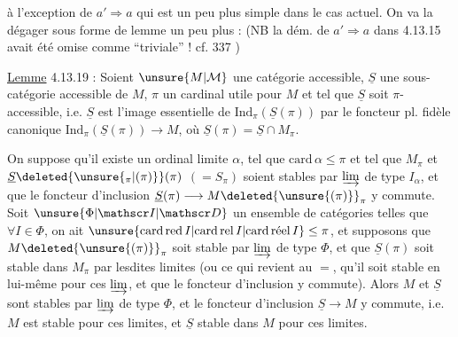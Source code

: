 
à l'exception de $a'\Rightarrow a$ qui est un peu plus simple dans le cas actuel. On va la dégager sous forme de lemme un peu plus  : (NB la dém. de $a'\Rightarrow a$ dans 4.13.15 avait été omise comme ``triviale'' ! cf.  337 \unsure{\ldots})

\uline{Lemme} 4.13.19 : Soient $\unsure{M|\mathcal M}$ une catégorie accessible, $\underline S$ une sous-catégorie accessible de $M$, $\pi$ un cardinal utile pour $M$ et tel que $\underline S$ soit $\pi$-accessible, i.e. $\underline S$ est l'image essentielle de $\mathrm{Ind}_\pi(\underline S(\pi))$ par le foncteur pl. fidèle canonique $\mathrm{Ind}_\pi(\underline S(\pi))\longrightarrow M$, où $\underline S(\pi)=\underline S\cap M_\pi$.

On suppose qu'il existe un ordinal limite $\alpha$, tel que $\mathrm{card}\,\alpha\leq\pi$ et tel que $M_\pi$ et $\underline S\deleted{\unsure{{}_{\pi}|(\pi)}}(\pi)$ $(=S_\pi)$ soient stables par $\varinjlim$ de type $I_\alpha$,  et que le foncteur d'inclusion $\underline S(\pi)\longrightarrow M\deleted{\unsure{(\pi)}}_\pi$ y commute. Soit $\unsure{\Phi|\mathscr I|\mathscr D}$ un ensemble de catégories  telles que $\forall I\in\Phi$, on ait $\unsure{\mathrm{card}\,\mathrm{red}\,I|\mathrm{card}\,\mathrm{rel}\,I|\mathrm{card}\,\text{réel}\,I}\leq\pi$, et supposons que $M\deleted{\unsure{(\pi)}}_\pi$   soit stable par $\varinjlim$ de type $\Phi$, et que $\underline S(\pi)$ soit stable dans $M_\pi$ par lesdites limites (ou ce qui revient au $=$, qu'il soit stable en lui-même pour ces $\varinjlim$, et que le foncteur d'inclusion y commute). Alors $M$ et $\underline S$ sont stables par $\varinjlim$ de type $\Phi$, et le foncteur d'inclusion $\underline S\longrightarrow M$ y commute, i.e. $M$ est stable pour ces limites, et $\underline S$ stable dans $M$ pour ces \unsure{$\Rightarrow$|$=$} limites.


